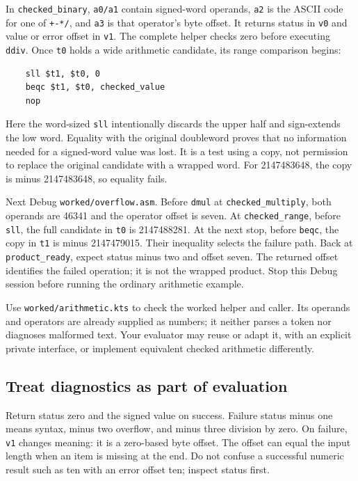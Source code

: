 

In \texttt{checked\_binary}, \texttt{a0/a1} contain signed-word operands,
\texttt{a2} is the ASCII code for one of \texttt{+-*/}, and \texttt{a3} is that
operator's byte offset. It returns status in \texttt{v0} and value or error
offset in \texttt{v1}. The complete helper checks zero before executing
\texttt{ddiv}. Once \texttt{t0} holds a wide arithmetic candidate, its range
comparison begins:
\begin{verbatim}
    sll $t1, $t0, 0
    beqc $t1, $t0, checked_value
    nop
\end{verbatim}

Here the word-sized \texttt{sll} intentionally discards the upper half and
sign-extends the low word. Equality with the original doubleword proves that
no information needed for a signed-word value was lost. It is a test using a
copy, not permission to replace the original candidate with a wrapped word.
For 2147483648, the copy is minus 2147483648, so equality fails.

Next Debug \texttt{worked/overflow.asm}. Before \texttt{dmul} at
\texttt{checked\_multiply}, both operands are 46341 and the operator offset is
seven. At \texttt{checked\_range}, before \texttt{sll}, the full candidate in
\texttt{t0} is 2147488281. At the next stop, before \texttt{beqc}, the copy in
\texttt{t1} is minus 2147479015. Their inequality selects the failure path.
Back at \texttt{product\_ready}, expect status minus two and offset seven.
The returned offset identifies the failed operation; it is not the wrapped
product. Stop this Debug session before running the ordinary arithmetic example.

Use \texttt{worked/arithmetic.kts} to check the worked
helper and caller. Its operands and operators are already supplied as numbers;
it neither parses a token nor diagnoses malformed text. Your evaluator may
reuse or adapt it, with an explicit private interface, or implement equivalent
checked arithmetic differently.

\subsection*{Treat diagnostics as part of evaluation}

Return status zero and the signed value on success. Failure status minus one
means syntax, minus two overflow, and minus three division by zero. On failure,
\texttt{v1} changes meaning: it is a zero-based byte offset. The offset can equal
the input length when an item is missing at the end. Do not confuse a successful
numeric result such as ten with an error offset ten; inspect status first.

